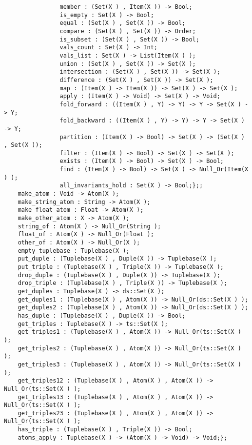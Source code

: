 \begin{verbatim}
                member : (Set(X ) , Item(X )) -> Bool;
                is_empty : Set(X ) -> Bool;
                equal : (Set(X ) , Set(X )) -> Bool;
                compare : (Set(X ) , Set(X )) -> Order;
                is_subset : (Set(X ) , Set(X )) -> Bool;
                vals_count : Set(X ) -> Int;
                vals_list : Set(X ) -> List(Item(X ) );
                union : (Set(X ) , Set(X )) -> Set(X );
                intersection : (Set(X ) , Set(X )) -> Set(X );
                difference : (Set(X ) , Set(X )) -> Set(X );
                map : (Item(X ) -> Item(X )) -> Set(X ) -> Set(X );
                apply : (Item(X ) -> Void) -> Set(X ) -> Void;
                fold_forward : ((Item(X ) , Y) -> Y) -> Y -> Set(X ) -> Y;
                fold_backward : ((Item(X ) , Y) -> Y) -> Y -> Set(X ) -> Y;
                partition : (Item(X ) -> Bool) -> Set(X ) -> (Set(X ) , Set(X ));
                filter : (Item(X ) -> Bool) -> Set(X ) -> Set(X );
                exists : (Item(X ) -> Bool) -> Set(X ) -> Bool;
                find : (Item(X ) -> Bool) -> Set(X ) -> Null_Or(Item(X ) );
                all_invariants_hold : Set(X ) -> Bool;};;
    make_atom : Void -> Atom(X );
    make_string_atom : String -> Atom(X );
    make_float_atom : Float -> Atom(X );
    make_other_atom : X -> Atom(X );
    string_of : Atom(X ) -> Null_Or(String );
    float_of : Atom(X ) -> Null_Or(Float );
    other_of : Atom(X ) -> Null_Or(X );
    empty_tuplebase : Tuplebase(X );
    put_duple : (Tuplebase(X ) , Duple(X )) -> Tuplebase(X );
    put_triple : (Tuplebase(X ) , Triple(X )) -> Tuplebase(X );
    drop_duple : (Tuplebase(X ) , Duple(X )) -> Tuplebase(X );
    drop_triple : (Tuplebase(X ) , Triple(X )) -> Tuplebase(X );
    get_duples : Tuplebase(X ) -> ds::Set(X );
    get_duples1 : (Tuplebase(X ) , Atom(X )) -> Null_Or(ds::Set(X ) );
    get_duples2 : (Tuplebase(X ) , Atom(X )) -> Null_Or(ds::Set(X ) );
    has_duple : (Tuplebase(X ) , Duple(X )) -> Bool;
    get_triples : Tuplebase(X ) -> ts::Set(X );
    get_triples1 : (Tuplebase(X ) , Atom(X )) -> Null_Or(ts::Set(X ) );
    get_triples2 : (Tuplebase(X ) , Atom(X )) -> Null_Or(ts::Set(X ) );
    get_triples3 : (Tuplebase(X ) , Atom(X )) -> Null_Or(ts::Set(X ) );
    get_triples12 : (Tuplebase(X ) , Atom(X ) , Atom(X )) -> Null_Or(ts::Set(X ) );
    get_triples13 : (Tuplebase(X ) , Atom(X ) , Atom(X )) -> Null_Or(ts::Set(X ) );
    get_triples23 : (Tuplebase(X ) , Atom(X ) , Atom(X )) -> Null_Or(ts::Set(X ) );
    has_triple : (Tuplebase(X ) , Triple(X )) -> Bool;
    atoms_apply : Tuplebase(X ) -> (Atom(X ) -> Void) -> Void;};
\end{verbatim}
